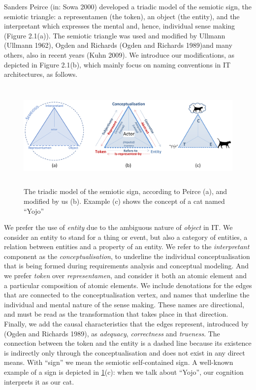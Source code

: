 \documentclass[a4paper,11pt,oneside,oldfontcommands]{memoir}
\theoremstyle{definition}
\theoremstyle{break}		%
\numberwithin{equation}{chapter}
\numberwithin{figure}{chapter}
\begin{document}
Sanders Peirce (in: Sowa 2000) developed a triadic model of the semiotic
sign, the semiotic triangle: a representamen (the token), an object (the
entity), and the interpretant which expresses the mental and, hence,
individual sense making (Figure 2.1(a)). The semiotic triangle was used
and modified by Ullmann (Ullmann 1962), Ogden and Richards (Ogden and
Richards 1989)and many others, also in recent years (Kuhn 2009). We
introduce our modifications, as depicted in Figure 2.1(b), which mainly
focus on naming conventions in IT architectures, as follows.

\begin{figure}
\hypertarget{fig:semiotic-triangles}{%
\centering
\includegraphics[width=6.25in,height=2.08333in]{src/images/SemioticTriangles.png}
\caption{The triadic model of the semiotic sign, according to Peirce
(a), and modified by us (b). Example (c) shows the concept of a cat
named ``Yojo''}\label{fig:semiotic-triangles}
}
\end{figure}

We prefer the use of \emph{entity} due to the ambiguous nature of
\emph{object} in IT. We consider an entity to stand for a thing or
event, but also a category of entities, a relation between entities and
a property of an entity. We refer to the \emph{interpretant} component
as the \emph{conceptualisation}, to underline the individual
conceptualisation that is being formed during requirements analysis and
conceptual modeling. And we prefer \emph{token} over
\emph{representamen}, and consider it both an atomic element and a
particular composition of atomic elements. We include denotations for
the edges that are connected to the conceptualisation vertex, and names
that underline the individual and mental nature of the sense making.
These names are directional, and must be read as the transformation that
takes place in that direction. Finally, we add the causal
characteristics that the edges represent, introduced by (Ogden and
Richards 1989), as \emph{adequacy}, \emph{correctness} and
\emph{trueness}. The connection between the token and the entity is a
dashed line because its existence is indirectly only through the
conceptualisation and does not exist in any direct means. With ``sign''
we mean the semiotic self-contained sign. A well-known example of a sign
is depicted in \cref{fig:semiotic-triangles}(c): when we talk about
``Yojo'', our cognition interprets it as our cat.
\end{document}
